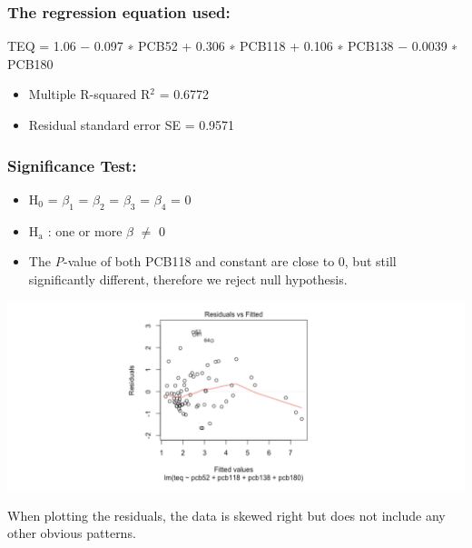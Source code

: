 \documentclass[11pt]{article}
\begin{document}
\subsubsection*{The regression equation used:}
\label{sec:org95b6a93}
TEQ = 1.06 − 0.097 ∗ PCB52 + 0.306 ∗ PCB118 + 0.106 ∗ PCB138 − 0.0039 ∗ PCB180
\begin{itemize}
\item Multiple R-squared R\(^{\text{2}}\) = 0.6772
\item Residual standard error SE = 0.9571
\end{itemize}

\subsubsection*{Significance Test:}
\label{sec:org070d237}
\begin{itemize}
\item H\(_{\text{0}}\) = \(\beta_{\text{1}}\) = \(\beta_{\text{2}}\) = \(\beta_{\text{3}}\) = \(\beta_{\text{4}}\) = 0
\item H\(_{\text{a}}\) : one or more \(\beta\) \(\neq\) 0
\item The \emph{P}-value of both PCB118 and constant are close to 0, but still significantly different, therefore we reject null hypothesis.
\end{itemize}

\begin{center}
\includegraphics[width=.9\linewidth]{./graphs/image7.png}
\end{center}
When plotting the residuals, the data is skewed right but does not include any other obvious patterns. 
\end{document}
